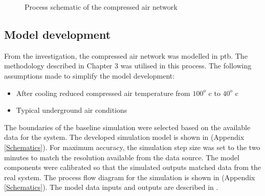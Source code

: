	\begin{figure}[h!]
		\centering
		\caption{Process schematic of the compressed air network}
		\label{fig: KUS Air layout}
	\end{figure}
\clearpage

\subsection{Model development}
	
From the investigation, the compressed air network was modelled in \gls{ptb}. The methodology described in Chapter 3 was utilised in this process. The following assumptions made to simplify the model development:
\begin{itemize}
	\item After cooling reduced compressed air temperature from $ 100 ^o $ \gls{c} to $ 40 ^o $ \gls{c}
	\item Typical underground air conditions
\end{itemize}
 The boundaries of the baseline simulation were selected based on the available data for the system. The developed simulation model is shown in  (Appendix \ref{Schematics}). For maximum accuracy, the simulation step size was set to the two minutes to match the resolution available from the data source.
The model components were calibrated so that the simulated outputs matched data from the real system. The process flow diagram for the simulation is shown in  (Appendix \ref{Schematics}). The model data inputs and outputs are described in .

